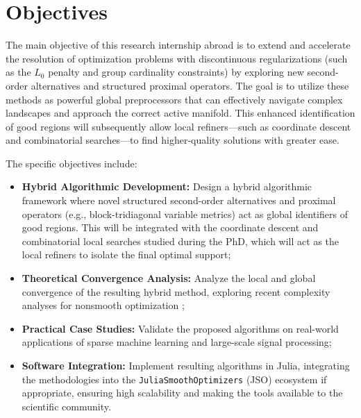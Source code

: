 \section{Objectives}

The main objective of this research internship abroad is to extend and accelerate the resolution of optimization problems with discontinuous regularizations (such as the $L_0$ penalty and group cardinality constraints) by exploring new second-order alternatives and structured proximal operators. The goal is to utilize these methods as powerful global preprocessors that can effectively navigate complex landscapes and approach the correct active manifold. This enhanced identification of good regions will subsequently allow local refiners---such as coordinate descent and combinatorial searches---to find higher-quality solutions with greater ease.

The specific objectives include:
\begin{itemize}
    \item \textbf{Hybrid Algorithmic Development:} Design a hybrid algorithmic framework where novel structured second-order alternatives and proximal operators (e.g., block-tridiagonal variable metrics) act as global identifiers of good regions. This will be integrated with the coordinate descent and combinatorial local searches studied during the PhD, which will act as the local refiners to isolate the final optimal support;
    \item \textbf{Theoretical Convergence Analysis:} Analyze the local and global convergence of the resulting hybrid method, exploring recent complexity analyses for nonsmooth optimization \cite{leconte2023complexity};
    \item \textbf{Practical Case Studies:} Validate the proposed algorithms on real-world applications of sparse machine learning and large-scale signal processing;
    \item \textbf{Software Integration:} Implement resulting algorithms in Julia, integrating the methodologies into the \texttt{JuliaSmoothOptimizers} (JSO) ecosystem if appropriate, ensuring high scalability and making the tools available to the scientific community.
\end{itemize}

